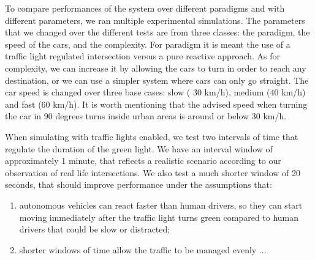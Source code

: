

To compare performances of the system over different paradigms and with different parameters, we ran
multiple experimental simulations.
The parameters that we changed over the different tests are from three classes: the paradigm, the speed of the cars, and the complexity.
For paradigm it is meant the use of  a traffic light regulated intersection versus a pure reactive approach.
As for complexity, we can increase it by allowing the cars to turn in order to reach any destination, or we can use a simpler system where cars can only go straight.
The car speed is changed over three base cases: slow ( 30 km/h), medium (40 km/h) and fast (60 km/h).
It is worth mentioning that the advised speed when turning the car in 90 degrees turns inside urban areas is around or below 30 km/h. %

When simulating with traffic lights enabled, we test two intervals of time that regulate the duration of the green light.
We have an interval window of approximately 1 minute, that reflects a realistic scenario according to our observation of real life intersections.
We also test a much shorter window of 20 seconds, that should improve performance under the assumptions that:
\begin{enumerate}
\item autonomous vehicles can react faster than human drivers, so they can start moving immediately after the traffic light turns green compared to human drivers that could be slow or distracted;
\item shorter windows of time allow the traffic to be managed evenly ... %
\end{enumerate}